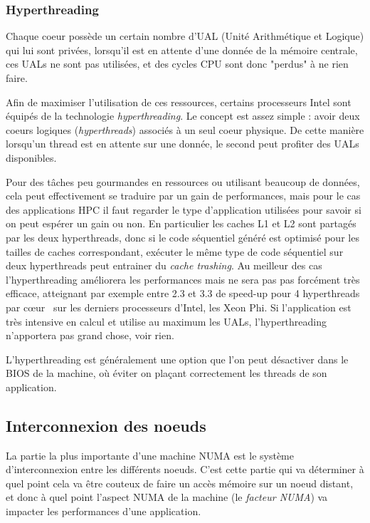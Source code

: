 \subsubsection{Hyperthreading}

Chaque coeur possède un certain nombre d'UAL (Unité Arithmétique et Logique) qui lui sont privées, lorsqu'il est en attente d'une donnée de la mémoire centrale, ces UALs ne sont pas utilisées, et des cycles CPU sont donc "perdus" à ne rien faire.

Afin de maximiser l'utilisation de ces ressources, certains processeurs Intel sont équipés de la technologie \emph{hyperthreading}.
Le concept est assez simple : avoir deux coeurs logiques (\emph{hyperthreads}) associés à un seul coeur physique.
De cette manière lorsqu'un thread est en attente sur une donnée, le second peut profiter des UALs disponibles.

Pour des tâches peu gourmandes en ressources ou utilisant beaucoup de données, cela peut effectivement se traduire par un gain de performances, mais pour le cas des applications HPC il faut regarder le type d'application utilisées pour savoir si on peut espérer un gain ou non.
En particulier les caches L1 et L2 sont partagés par les deux hyperthreads, donc si le code séquentiel généré est optimisé pour les tailles de caches correspondant, exécuter le même type de code séquentiel sur deux hyperthreads peut entrainer du \emph{cache trashing}.
Au meilleur des cas l'hyperthreading améliorera les performances mais ne sera pas pas forcément très efficace, atteignant par exemple entre 2.3 et 3.3 de speed-up pour 4 hyperthreads par cœur~\cite{Jeffers2016} sur les derniers processeurs d'Intel, les Xeon Phi.
Si l'application est très intensive en calcul et utilise au maximum les UALs, l'hyperthreading n'apportera pas grand chose, voir rien.

L'hyperthreading est généralement une option que l'on peut désactiver dans le BIOS de la machine, où éviter on plaçant correctement les threads de son application.


\subsection{Interconnexion des noeuds}\label{sec:context:numa:interconnect}

La partie la plus importante d'une machine NUMA est le système d'interconnexion entre les différents noeuds.
C'est cette partie qui va déterminer à quel point cela va être couteux de faire un accès mémoire sur un noeud distant, et donc à quel point l'aspect NUMA de la machine (le \emph{facteur NUMA}) va impacter les performances d'une application.

